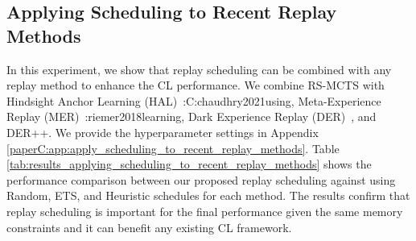 
\subsection{Applying Scheduling to Recent Replay Methods}\label{paperC:sec:applying_scheduling_to_recent_replay_methods}

In this experiment, we show that replay scheduling can be combined with any replay method to enhance the CL performance. We combine RS-MCTS with Hindsight Anchor Learning (HAL)~\citeC:{C:chaudhry2021using}, Meta-Experience Replay (MER)~\citeC:{riemer2018learning}, Dark Experience Replay (DER)~, and DER++. We provide the hyperparameter settings in Appendix \ref{paperC:app:apply_scheduling_to_recent_replay_methods}. Table \ref{tab:results_applying_scheduling_to_recent_replay_methods} shows the performance comparison between our proposed replay scheduling against using Random, ETS, and Heuristic schedules for each method. The results confirm that replay scheduling %
is important for the final performance given the same memory constraints and it can benefit any existing CL framework. 


